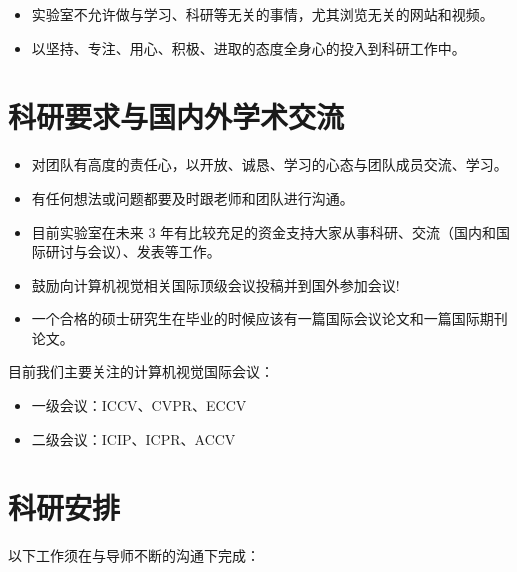 \documentclass[a4paper，12pt]{article}
\begin{document}
\begin{itemize}

\item 实验室不允许做与学习、科研等无关的事情，尤其浏览无关的网站和视频。

\item 以坚持、专注、用心、积极、进取的态度全身心的投入到科研工作中。

\end{itemize}

\section{科研要求与国内外学术交流}

\begin{itemize}

\item 对团队有高度的责任心，以开放、诚恳、学习的心态与团队成员交流、学习。

\item 有任何想法或问题都要及时跟老师和团队进行沟通。

\item 目前实验室在未来 3 年有比较充足的资金支持大家从事科研、交流（国内和国际研讨与会议）、发表等工作。

\item 鼓励向计算机视觉相关国际顶级会议投稿并到国外参加会议!

\item 一个合格的硕士研究生在毕业的时候应该有一篇国际会议论文和一篇国际期刊论文。

\end{itemize}

目前我们主要关注的计算机视觉国际会议：

\begin{itemize}

\item 一级会议：ICCV、CVPR、ECCV

\item 二级会议：ICIP、ICPR、ACCV

\end{itemize}

\section{科研安排}

以下工作须在与导师不断的沟通下完成：
\end{document}
